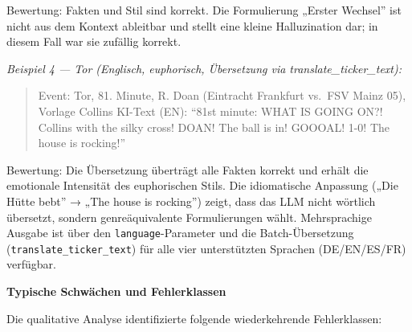 Bewertung: Fakten und Stil sind korrekt. Die Formulierung „Erster
Wechsel'' ist nicht aus dem Kontext ableitbar und stellt eine kleine
Halluzination dar; in diesem Fall war sie zufällig korrekt.

\emph{Beispiel 4 --- Tor (Englisch, euphorisch, Übersetzung via
translate\_ticker\_text):}

\begin{quote}
Event: Tor, 81. Minute, R. Doan (Eintracht Frankfurt vs.~FSV Mainz 05),
Vorlage Collins KI-Text (EN): ``81st minute: WHAT IS GOING ON?! Collins
with the silky cross! DOAN! The ball is in! GOOOAL! 1-0! The house is
rocking!''
\end{quote}

Bewertung: Die Übersetzung überträgt alle Fakten korrekt und erhält die
emotionale Intensität des euphorischen Stils. Die idiomatische Anpassung
(„Die Hütte bebt'' → „The house is rocking'') zeigt, dass das LLM nicht
wörtlich übersetzt, sondern genreäquivalente Formulierungen wählt.
Mehrsprachige Ausgabe ist über den \texttt{language}-Parameter und die
Batch-Übersetzung (\texttt{translate\_ticker\_text}) für alle vier
unterstützten Sprachen (DE/EN/ES/FR) verfügbar.

\textbf{Typische Schwächen und Fehlerklassen}

Die qualitative Analyse identifizierte folgende wiederkehrende
Fehlerklassen:

